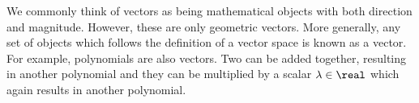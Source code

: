 We commonly think of vectors as being mathematical objects with both direction and magnitude. However, these are only geometric vectors. More generally, any set of objects which follows the definition of a vector space is known as a vector. For example, polynomials are also vectors. Two can be added together, resulting in another polynomial and they can be multiplied by a scalar $ \lambda \in \real $ which again results in another polynomial. 


